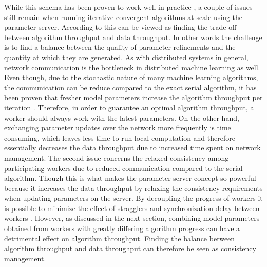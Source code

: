 While this schema has been proven to work well in practice \cite{Li2014} \cite{dai2014high}, a couple of issues still remain when running iterative-convergent algorithms at scale using the parameter server.
According to \cite{wei2015managed} this can be viewed as finding the trade-off between algorithm throughput and data throughput.
In other words the challenge is to find a balance between the quality of parameter refinements and the quantity at which they are generated.
As with distributed systems in general, network communication is the bottleneck in distributed machine learning as well.
Even though, due to the stochastic nature of many machine learning algorithms, the communication can be reduce compared to the exact serial algorithm, it has been proven that fresher model parameters increase the algorithm throughput per iteration \cite{langford2009slow}.
Therefore, in order to guarantee an optimal algorithm throughput, a worker should always work with the latest parameters.
On the other hand, exchanging parameter updates over the network more frequently is time consuming, which leaves less time to run local computation and therefore essentially decreases the data throughput due to increased time spent on network management.
The second issue concerns the relaxed consistency among participating workers due to reduced communication compared to the serial algorithm.
Though this is what makes the parameter server concept so powerful because it increases the data throughput by relaxing the consistency requirements when updating parameters on the server.
By decoupling the progress of workers it is possible to minimize the effect of stragglers and synchronization delay between workers \cite{ananthanarayanan2013effective}.
However, as discussed in the next section, combining model parameters obtained from workers with greatly differing algorithm progress can have a detrimental effect on algorithm throughput.
Finding the balance between algorithm throughput and data throughput can therefore be seen as consistency management.



